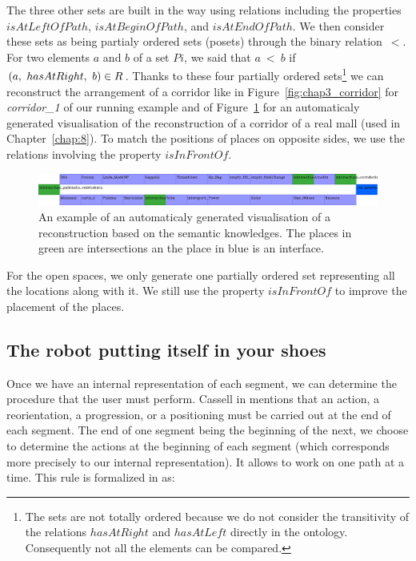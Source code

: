 The three other sets are built in the way using relations including the properties $isAtLeftOfPath$, $isAtBeginOfPath$, and $isAtEndOfPath$. We then consider these sets as being partialy ordered sets (posets) through the binary relation~$<$. For two elements $a$ and $b$ of a set $Pi$, we said that $a\ <\ b$ if $(a,\ hasAtRight,\ b) \in R$. Thanks to these four partially ordered sets\footnote{The sets are not totally ordered because we do not consider the transitivity of the relations $hasAtRight$ and $hasAtLeft$ directly in the ontology. Consequently not all the elements can be compared.} we can reconstruct the arrangement of a corridor like in Figure~\ref{fig:chap3_corridor} for \textit{corridor\_1} of our running example and of Figure~\ref{fig:chap3_pallokatu} for an automaticaly generated visualisation of the reconstruction of a corridor of a real mall (used in Chapter~\ref{chap:8}). To match the positions of places on opposite sides, we use the relations involving the property $isInFrontOf$.

\begin{figure}[ht!]
\centering
\includegraphics[width=\textwidth]{figures/chapter3/pallokatu.png}
\caption{\label{fig:chap3_pallokatu} An example of an automaticaly generated visualisation of a reconstruction based on the semantic knowledges. The places in green are intersections an the place in blue is an interface. }
\end{figure}

For the open spaces, we only generate one partially ordered set representing all the locations along with it. We still use the property $isInFrontOf$ to improve the placement of the places.

\subsection{The robot putting itself in your shoes}

Once we have an internal representation of each segment, we can determine the procedure that the user must perform. Cassell in \cite{cassell_2007_trading} mentions that an action, a reorientation, a progression, or a positioning must be carried out at the end of each segment. The end of one segment being the beginning of the next, we choose to determine the actions at the beginning of each segment (which corresponds more precisely to our internal representation). It allows to work on one path at a time. This rule is formalized in \cite{mallot_2009_embodied} as:

